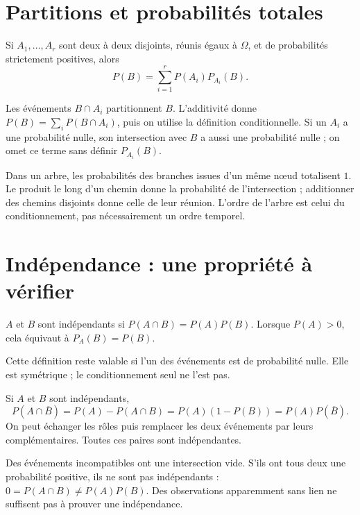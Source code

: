 \documentclass[../cours_1re.tex]{subfiles}
\begin{document}
\section{Partitions et probabilités totales}
\begin{theoreme}
Si $A_1,\ldots,A_r$ sont deux à deux disjoints, réunis égaux à $\Omega$,
et de probabilités strictement positives, alors
\[
P(B)=\sum_{i=1}^r P(A_i)P_{A_i}(B).
\]
\end{theoreme}
\begin{demonstration}
Les événements $B\cap A_i$ partitionnent $B$. L'additivité donne
$P(B)=\sum_iP(B\cap A_i)$, puis on utilise la définition conditionnelle.
Si un $A_i$ a une probabilité nulle, son intersection avec $B$ a aussi
une probabilité nulle ; on omet ce terme sans définir $P_{A_i}(B)$.
\end{demonstration}
Dans un arbre, les probabilités des branches issues d'un même nœud
totalisent $1$. Le produit le long d'un chemin donne la probabilité
de l'intersection ; additionner des chemins disjoints donne celle de leur réunion.
L'ordre de l'arbre est celui du conditionnement, pas nécessairement un ordre temporel.

\section{Indépendance : une propriété à vérifier}
\begin{definition}
$A$ et $B$ sont indépendants si $P(A\cap B)=P(A)P(B)$.
Lorsque $P(A)>0$, cela équivaut à $P_A(B)=P(B)$.
\end{definition}
Cette définition reste valable si l'un des événements est de probabilité nulle.
Elle est symétrique ; le conditionnement seul ne l'est pas.
\begin{demonstration}
Si $A$ et $B$ sont indépendants,
\[
P(A\cap\overline B)=P(A)-P(A\cap B)
=P(A)(1-P(B))=P(A)P(\overline B).
\]
On peut échanger les rôles puis remplacer les deux événements par leurs
complémentaires. Toutes ces paires sont indépendantes.
\end{demonstration}
\begin{attention}
Des événements incompatibles ont une intersection vide. S'ils ont tous deux
une probabilité positive, ils ne sont pas indépendants :
$0=P(A\cap B)\ne P(A)P(B)$.
Des observations apparemment sans lien ne suffisent pas à prouver une indépendance.
\end{attention}
\end{document}
